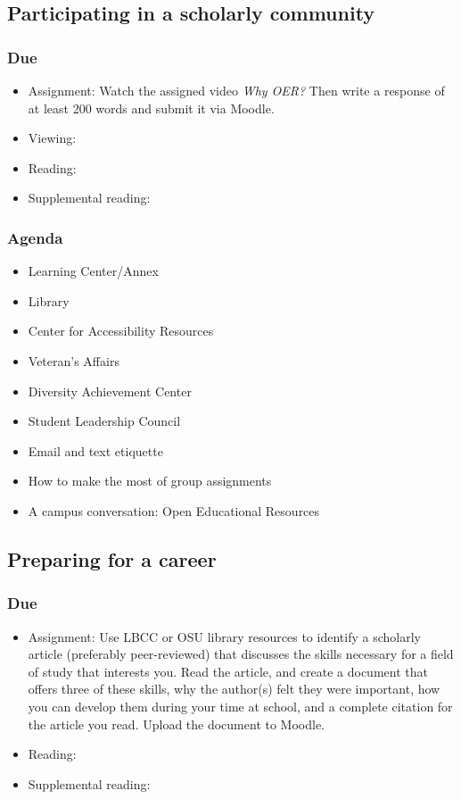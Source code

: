 \documentclass[12pt,article,oneside]{memoir}
\begin{document}
\subsection{Participating in a scholarly community}
\subsubsection{Due}
\begin{itemize}
 \item Assignment: Watch the assigned video \emph{Why OER?}  Then write a response of at least 200 words and submit it via Moodle. 
 \item Viewing: \cite{oer}
 \item Reading: \cite{wellsley}
 \item Supplemental reading: \cite{oer-dh}
\end{itemize}


\subsubsection{Agenda}
\begin{itemize}
 \item Learning Center/Annex
 \item Library
 \item Center for Accessibility Resources
 \item Veteran's Affairs
 \item Diversity Achievement Center
 \item Student Leadership Council
 \item Email and text etiquette
 \item How to make the most of group assignments
 \item A campus conversation: Open Educational Resources
\end{itemize}


\subsection{Preparing for a career}
\subsubsection{Due}
\begin{itemize}
 \item Assignment: Use LBCC or OSU library resources to identify a scholarly article (preferably peer-reviewed) that discusses the skills necessary for a field of study that interests you.  Read the article, and create a document that offers three of these skills, why the author(s) felt they were important, how you can develop them during your time at school, and a complete citation for the article you read.  Upload the document to Moodle.
 \item Reading:  \cite{ooh}
 \item Supplemental reading:
\end{itemize}
\end{document}
